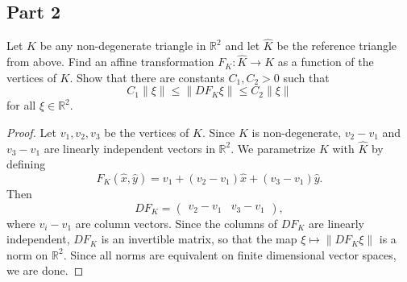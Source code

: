 \documentclass{article}
\theoremstyle{plain}
\begin{document}
\subsection*{Part 2}
Let $K$ be any non-degenerate triangle in $\mathbb R^2$ and let $\widehat K$ be the reference triangle from above.
Find an affine transformation $F_K : \widehat K \to K$ as a function of the vertices of $K$.
Show that there are constants $C_1,C_2 > 0$ such that
\begin{equation*}
	C_1\|\xi\| \leq \|DF_K\xi\| \leq C_2\|\xi\|
\end{equation*}
for all $\xi \in \mathbb R^2$.
\begin{proof}
	Let $v_1,v_2,v_3$ be the vertices of $K$.
	Since $K$ is non-degenerate, $v_2 - v_1$ and $v_3 - v_1$ are linearly independent vectors in $\mathbb R^2$.
	We parametrize $K$ with $\widehat K$ by defining
	\begin{equation*}
		F_K(\widehat x, \widehat y) = v_1 + (v_2 - v_1)\widehat x + (v_3 - v_1)\widehat y.
	\end{equation*}
	Then
	\[DF_K = \begin{pmatrix} v_2 - v_1 & v_3 - v_1 \end{pmatrix},\]
	where $v_i - v_1$ are column vectors.
	Since the columns of $DF_K$ are linearly independent, $DF_K$ is an invertible matrix, so that the map $\xi \mapsto \|DF_K\xi\|$ is a norm on $\mathbb R^2$.
	Since all norms are equivalent on finite dimensional vector spaces, we are done.

\end{proof}
\end{document}
